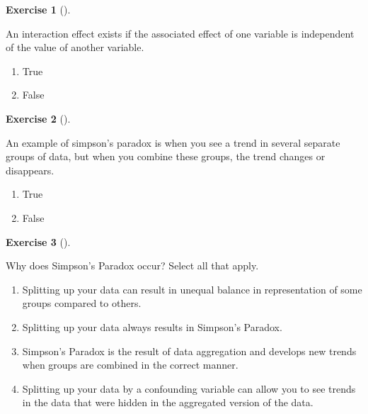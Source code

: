 \documentclass[
  letterpaper,
  DIV=11,
  numbers=noendperiod]{scrreprt}
\providecommand{\tightlist}{%
  \setlength{\itemsep}{0pt}\setlength{\parskip}{0pt}}\usepackage{longtable,booktabs,array}
\theoremstyle{definition}
\newtheorem{exercise}{Exercise}[chapter]
\theoremstyle{remark}
\begin{document}
\leavevmode{}%
\begin{exercise}[]\label{exr-ch06-c03}

An interaction effect exists if the associated effect of one variable is
independent of the value of another variable.

\begin{enumerate}
\def\labelenumi{\alph{enumi})}
\tightlist
\item
  True
\item
  False
\end{enumerate}

\end{exercise}

\leavevmode{}%
\begin{exercise}[]\label{exr-ch06-c04}

An example of simpson's paradox is when you see a trend in several
separate groups of data, but when you combine these groups, the trend
changes or disappears.

\begin{enumerate}
\def\labelenumi{\alph{enumi})}
\tightlist
\item
  True
\item
  False
\end{enumerate}

\end{exercise}

\leavevmode{}%
\begin{exercise}[]\label{exr-ch06-c05}

Why does Simpson's Paradox occur? Select all that apply.

\begin{enumerate}
\def\labelenumi{\alph{enumi})}
\tightlist
\item
  Splitting up your data can result in unequal balance in representation
  of some groups compared to others.
\item
  Splitting up your data always results in Simpson's Paradox.
\item
  Simpson's Paradox is the result of data aggregation and develops new
  trends when groups are combined in the correct manner.
\item
  Splitting up your data by a confounding variable can allow you to see
  trends in the data that were hidden in the aggregated version of the
  data.
\end{enumerate}

\end{exercise}
\end{document}
